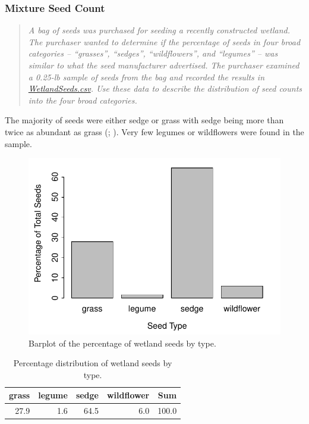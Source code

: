 \documentclass[10pt,openany]{book}\usepackage[]{graphicx}\usepackage[]{color}
\newenvironment{knitrout}{}{} %
\begin{document}
\subsubsection{Mixture Seed Count}
\begin{quote}
\textit{A bag of seeds was purchased for seeding a recently constructed wetland.  The purchaser wanted to determine if the percentage of seeds in four broad categories -- ``grasses'', ``sedges'', ``wildflowers'', and ``legumes'' -- was similar to what the seed manufacturer advertised.  The purchaser examined a 0.25-lb sample of seeds from the bag and recorded the results in \href{https://raw.githubusercontent.com/droglenc/NCData/master/WetlandSeeds.csv}{WetlandSeeds.csv}.  Use these data to describe the distribution of seed counts into the four broad categories.}
\end{quote}



The majority of seeds were either sedge or grass with sedge being more than twice as abundant as grass (; ).  Very few legumes or wildflowers were found in the sample.

\begin{knitrout}
\color{fgcolor}\begin{figure}[hbtp]

{\centering \includegraphics[width=.5\linewidth]{Figs/SeedBarplot-1} 

}

\caption[Barplot of the percentage of wetland seeds by type]{Barplot of the percentage of wetland seeds by type.}\label{fig:SeedBarplot}
\end{figure}


\end{knitrout}

\begin{table}[ht]
\centering
\caption{Percentage distribution of wetland seeds by type.} 
\label{tab:SeedTable}
\begin{tabular}{rrrrr}
  \hline
grass & legume & sedge & wildflower & Sum \\ 
  \hline
27.9 & 1.6 & 64.5 & 6.0 & 100.0 \\ 
   \hline
\end{tabular}
\end{table}
\end{document}
